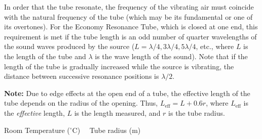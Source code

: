 In order that the tube resonate, the frequency of the vibrating air must coincide with the natural frequency of the tube (which may be its fundamental or one of its overtones). For the Economy Resonance Tube, which is closed at one end, this requirement is met if the tube length is an odd number of quarter wavelengths of the sound waves produced by the source ($L = \lambda/4, 3 \lambda/4, 5 \lambda/4$, etc., where $L$ is the length of the tube and $\lambda$ is the wave length of the sound). Note that if the length of the tube is gradually increased while the source is vibrating, the distance between successive resonance positions is $\lambda/2$. 

\textbf{Note:} Due to edge effects at the open end of a tube, the effective length of the tube depends on the radius of the opening. Thus, $L_{\mathrm{eff}} = L + 0.6r$, where $L_\text{eff}$ is the \textit{effective} length, $L$ is the length measured, and $r$ is the tube radius.

\medskip
Room Temperature ($^\circ$C) \hrulefill \ \  Tube radius (m) \hrulefill

\bigskip

